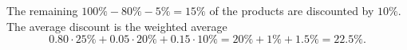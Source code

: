 The remaining $100\%-80\%-5\%=15\%$ of the products are discounted by $10\%$. The average discount is the weighted average
\[0.80\cdot25\%+0.05\cdot20\%+0.15\cdot10\%=20\%+1\%+1.5\%=\boxed{22.5\%}.\]
